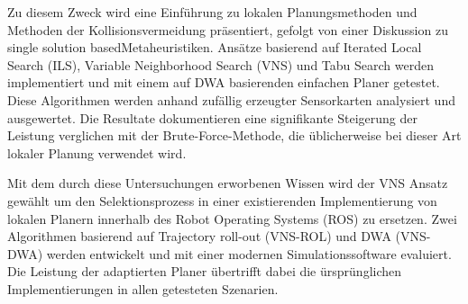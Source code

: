 Zu diesem Zweck wird eine Einf\"uhrung zu lokalen Planungsmethoden und Methoden der Kollisionsvermeidung pr\"asentiert, gefolgt von einer Diskussion zu \glqq single solution based\grqq  Metaheuristiken. 
Ans\"atze basierend auf Iterated Local Search (ILS), Variable Neighborhood Search (VNS) und Tabu Search werden implementiert und mit einem auf DWA basierenden einfachen Planer getestet. 
Diese Algorithmen werden anhand zuf\"allig erzeugter Sensorkarten analysiert und ausgewertet. 
Die Resultate dokumentieren eine signifikante Steigerung der Leistung verglichen mit der Brute-Force-Methode, die \"ublicherweise bei dieser Art lokaler Planung verwendet wird.

Mit dem durch diese Untersuchungen erworbenen Wissen wird der VNS Ansatz gew\"ahlt um den Selektionsprozess in einer existierenden Implementierung von lokalen Planern innerhalb des Robot Operating Systems (ROS) zu ersetzen. 
Zwei Algorithmen basierend auf Trajectory roll-out (VNS-ROL) und DWA (VNS-DWA) werden entwickelt und mit einer modernen Simulationssoftware evaluiert. 
Die Leistung der adaptierten Planer \"ubertrifft dabei die \"ursprünglichen Implementierungen in allen getesteten Szenarien. 

\endgroup			

\vfill